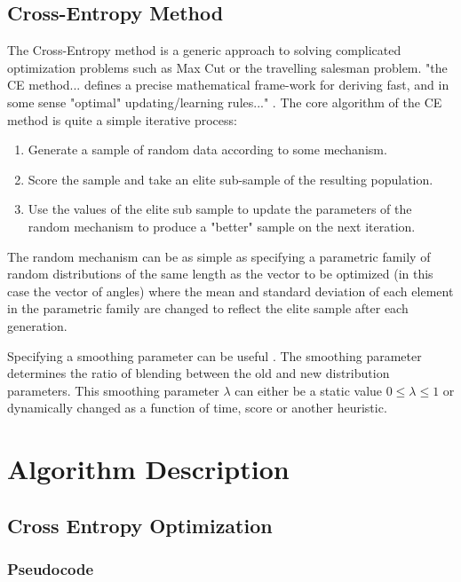 \documentclass[conference,letterpaper]{IEEEtran}
\begin{document}
\subsection{Cross-Entropy Method}
The Cross-Entropy method is a generic approach to solving complicated optimization problems such as Max Cut or the travelling salesman problem. "the CE method... defines a precise mathematical frame-work for deriving fast, and in some sense "optimal" updating/learning rules..." \cite{CE}. The core algorithm of the CE method is quite a simple iterative process:
\begin{enumerate}
    \item Generate a sample of random data according to some mechanism.
    \item Score the sample and take an elite sub-sample of the resulting population.
    \item Use the values of the elite sub sample to update the parameters of the random mechanism to produce a "better" sample on the next iteration.
\end{enumerate}
\par The random mechanism can be as simple as specifying a parametric family of random distributions of the same length as the vector to be optimized (in this case the vector of angles) where the mean and standard deviation of each element in the parametric family are changed to reflect the elite sample after each generation. 
\par Specifying a smoothing parameter can be useful \cite{CE2}. The smoothing parameter determines the ratio of blending between the old and new distribution parameters. This smoothing parameter $\lambda$ can either be a static value $0 \leq \lambda \leq 1$ or dynamically changed as a function of time, score or another heuristic.

\section{Algorithm Description}
\subsection{Cross Entropy Optimization}
\subsubsection{Pseudocode}


% 
\end{document}
